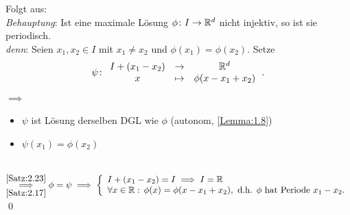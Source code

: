 \documentclass[a4paper]{article}
\begin{document}
\begin{Beweis}
Folgt aus:\\
\textit{Behauptung}: Ist eine maximale Lösung $\phi\colon I\to\mathbb R^d$ nicht injektiv, so ist sie periodisch.\\
\textit{denn}: Seien $x_1,x_2\in I$ mit $x_1\ne x_2$ und $\phi(x_1)=\phi(x_2)$. Setze
\[\psi\colon \begin{array}{clc}
I+(x_1-x_2)&\to& \mathbb R^d\\
x&\mapsto& \phi(x-x_1+x_2)
\end{array}\,. \]
$\implies$\begin{minipage}[t]{0.8\textwidth}
\begin{itemize}
\item $\psi$ ist Lösung derselben DGL wie $\phi$ (autonom, \ref{Lemma:1.8})
\item $\psi(x_1)=\phi(x_2)$
\end{itemize}
\vspace{0.2cm}
\end{minipage}\\
$\overset{\ref{Satz:2.23}}{\underset{\ref{Satz:2.17}}{\implies}} \phi=\psi\implies \left\{ \begin{array}{ll}
I+(x_1-x_2)=I\implies I=\mathbb R\\
\forall x\in\mathbb R:\,\phi(x)=\phi(x-x_1+x_2),\text{ d.h. $\phi$ hat Periode $x_1-x_2$.}
\end{array}\right.$\\\qed
\end{Beweis}
\end{document}
